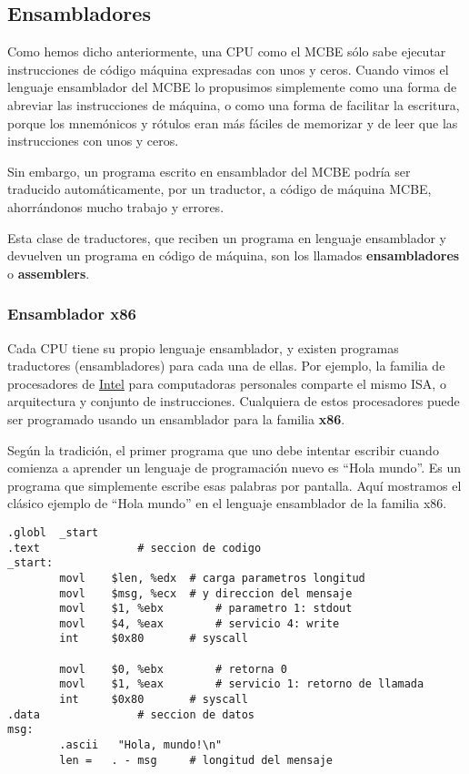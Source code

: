 \documentclass[spanish,A4,]{article}
\begin{document}
\subsection{Ensambladores}\label{ensambladores}

Como hemos dicho anteriormente, una CPU como el MCBE sólo sabe ejecutar
instrucciones de código máquina expresadas con unos y ceros. Cuando
vimos el lenguaje ensamblador del MCBE lo propusimos simplemente como
una forma de abreviar las instrucciones de máquina, o como una forma de
facilitar la escritura, porque los mnemónicos y rótulos eran más fáciles
de memorizar y de leer que las instrucciones con unos y ceros.

Sin embargo, un programa escrito en ensamblador del MCBE podría ser
traducido automáticamente, por un traductor, a código de máquina MCBE,
ahorrándonos mucho trabajo y errores.

Esta clase de traductores, que reciben un programa en lenguaje
ensamblador y devuelven un programa en código de máquina, son los
llamados \textbf{ensambladores} o \textbf{assemblers}.

\subsubsection{Ensamblador x86}\label{ensamblador-x86}

Cada CPU tiene su propio lenguaje ensamblador, y existen programas
traductores (ensambladores) para cada una de ellas. Por ejemplo, la
familia de procesadores de
\href{https://es.m.wikipedia.org/wiki/Intel_Corporation}{Intel} para
computadoras personales comparte el mismo ISA, o arquitectura y conjunto
de instrucciones. Cualquiera de estos procesadores puede ser programado
usando un ensamblador para la familia \textbf{x86}.

Según la tradición, el primer programa que uno debe intentar escribir
cuando comienza a aprender un lenguaje de programación nuevo es ``Hola
mundo''. Es un programa que simplemente escribe esas palabras por
pantalla. Aquí mostramos el clásico ejemplo de ``Hola mundo'' en el
lenguaje ensamblador de la familia x86.

\begin{verbatim}
.globl  _start
.text               # seccion de codigo
_start:
        movl    $len, %edx  # carga parametros longitud
        movl    $msg, %ecx  # y direccion del mensaje
        movl    $1, %ebx        # parametro 1: stdout
        movl    $4, %eax        # servicio 4: write
        int     $0x80       # syscall

        movl    $0, %ebx        # retorna 0
        movl    $1, %eax        # servicio 1: retorno de llamada
        int     $0x80       # syscall
.data               # seccion de datos
msg:
        .ascii   "Hola, mundo!\n"
        len =   . - msg     # longitud del mensaje
\end{verbatim}
\end{document}
